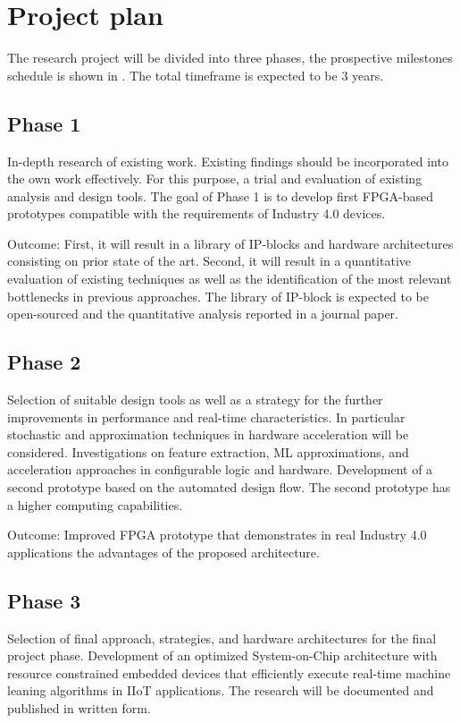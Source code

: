 \section{Project plan}
The research project will be divided into three phases, the prospective milestones schedule is shown in . The total timeframe is expected to be 3 years.

\subsection{Phase 1}
In-depth research of existing work. Existing findings should be incorporated into the own work effectively. For this purpose, a trial and evaluation of existing analysis and design tools. The goal of Phase 1 is to develop first FPGA-based prototypes compatible with the requirements of Industry 4.0 devices.

Outcome: First, it will result in a library of IP-blocks and hardware architectures consisting on prior state of the art. Second, it will result in a quantitative evaluation of existing techniques as well as the identification of the most relevant bottlenecks in previous approaches. The library of IP-block is expected to be open-sourced and the quantitative analysis reported in a journal paper.

\subsection{Phase 2}
Selection of suitable design tools as well as a strategy for the further improvements in performance and real-time characteristics. In particular stochastic and approximation techniques in hardware acceleration will be considered. Investigations on feature extraction, ML approximations, and acceleration approaches in configurable logic and hardware. Development of a second prototype based on the automated design flow. The second prototype has a higher computing capabilities.

Outcome: Improved FPGA prototype that demonstrates in real Industry 4.0 applications the advantages of the proposed architecture.

\subsection{Phase 3}
Selection of final approach, strategies, and hardware architectures for the final project phase. Development of an optimized System-on-Chip architecture with resource constrained embedded devices that efficiently execute real-time machine leaning algorithms in IIoT applications. The research will be documented and published in written form.

